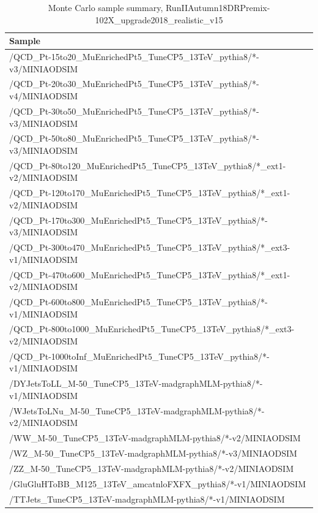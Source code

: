 \begin{table}[htb]
  \caption{Monte Carlo sample summary, RunIIAutumn18DRPremix-102X\_upgrade2018\_realistic\_v15}
  \begin{center}
    \footnotesize
    \begin{tabular}{l}\hline
      Sample \\
      \hline
      /QCD\_Pt-15to20\_MuEnrichedPt5\_TuneCP5\_13TeV\_pythia8/*-v3/MINIAODSIM \\
      /QCD\_Pt-20to30\_MuEnrichedPt5\_TuneCP5\_13TeV\_pythia8/*-v4/MINIAODSIM \\
      /QCD\_Pt-30to50\_MuEnrichedPt5\_TuneCP5\_13TeV\_pythia8/*-v3/MINIAODSIM \\
      /QCD\_Pt-50to80\_MuEnrichedPt5\_TuneCP5\_13TeV\_pythia8/*-v3/MINIAODSIM \\
      /QCD\_Pt-80to120\_MuEnrichedPt5\_TuneCP5\_13TeV\_pythia8/*\_ext1-v2/MINIAODSIM \\
      /QCD\_Pt-120to170\_MuEnrichedPt5\_TuneCP5\_13TeV\_pythia8/*\_ext1-v2/MINIAODSIM \\
      /QCD\_Pt-170to300\_MuEnrichedPt5\_TuneCP5\_13TeV\_pythia8/*-v3/MINIAODSIM \\
      /QCD\_Pt-300to470\_MuEnrichedPt5\_TuneCP5\_13TeV\_pythia8/*\_ext3-v1/MINIAODSIM \\
      /QCD\_Pt-470to600\_MuEnrichedPt5\_TuneCP5\_13TeV\_pythia8/*\_ext1-v2/MINIAODSIM \\
      /QCD\_Pt-600to800\_MuEnrichedPt5\_TuneCP5\_13TeV\_pythia8/*-v1/MINIAODSIM \\
      /QCD\_Pt-800to1000\_MuEnrichedPt5\_TuneCP5\_13TeV\_pythia8/*\_ext3-v2/MINIAODSIM \\
      /QCD\_Pt-1000toInf\_MuEnrichedPt5\_TuneCP5\_13TeV\_pythia8/*-v1/MINIAODSIM \\
      /DYJetsToLL\_M-50\_TuneCP5\_13TeV-madgraphMLM-pythia8/*-v1/MINIAODSIM \\
      /WJetsToLNu\_M-50\_TuneCP5\_13TeV-madgraphMLM-pythia8/*-v2/MINIAODSIM \\
      /WW\_M-50\_TuneCP5\_13TeV-madgraphMLM-pythia8/*-v2/MINIAODSIM \\
      /WZ\_M-50\_TuneCP5\_13TeV-madgraphMLM-pythia8/*-v3/MINIAODSIM \\
      /ZZ\_M-50\_TuneCP5\_13TeV-madgraphMLM-pythia8/*-v2/MINIAODSIM \\
      /GluGluHToBB\_M125\_13TeV\_amcatnloFXFX\_pythia8/*-v1/MINIAODSIM \\
      /TTJets\_TuneCP5\_13TeV-madgraphMLM-pythia8/*-v1/MINIAODSIM \\

\end{tabular}
\end{center}
\end{table}
